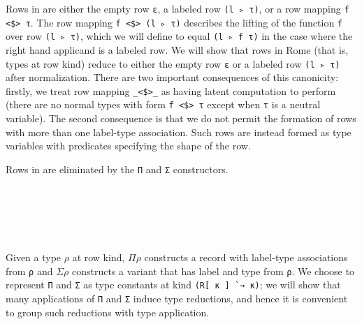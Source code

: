\documentclass[authoryear, acmsmall, screen, review, nonacm]{acmart}
\begin{document}
Rows in \Rome are either the empty row \verb!ε!, a labeled row \verb!(l ▹ τ)!, or a row mapping \verb!f <$> τ!. The row mapping \verb!f <$> (l ▹ τ)! describes the lifting of the function \verb!f! over row \verb!(l ▹ τ)!, which we will define to equal \verb!(l ▹ f τ)! in the case where the right hand applicand is a labeled row. We will show that rows in Rome (that is, types at row kind) reduce to either the empty row \verb!ε! or a labeled row \verb!(l ▹ τ)! after normalization. There are two important consequences of this canonicity: firstly, we treat row mapping \verb!_<$>_! as having latent computation to perform (there are no normal types with form \verb!f <$> τ! except when \verb!τ! is a neutral variable). The second consequence is that we do not permit the formation of rows with more than one label-type association. Such rows are instead formed as type variables with predicates specifying the shape of the row.

Rows in \Rome are eliminated by the \verb!Π! and \verb!Σ! constructors.

\begin{code}%
%
\>[2]%
\>[8]\AgdaSymbol{:}\<%
\\
\>[8][@{}l@{\AgdaIndent{0}}]%
\>[10]\AgdaSpace{}%
\AgdaSpace{}%
\AgdaSymbol{(}\AgdaOperator{\AgdaInductiveConstructor{R[}}\AgdaSpace{}%
\AgdaSpace{}%
\AgdaOperator{\AgdaInductiveConstructor{]}}\AgdaSpace{}%
\AgdaSpace{}%
\AgdaSymbol{)}\<%
\\
%
\\[\AgdaEmptyExtraSkip]%
%
\>[2]%
\>[8]\AgdaSymbol{:}\<%
\\
\>[8][@{}l@{\AgdaIndent{0}}]%
\>[10]\AgdaSpace{}%
\AgdaSpace{}%
\AgdaSymbol{(}\AgdaOperator{\AgdaInductiveConstructor{R[}}\AgdaSpace{}%
\AgdaSpace{}%
\AgdaOperator{\AgdaInductiveConstructor{]}}\AgdaSpace{}%
\AgdaSpace{}%
\AgdaSymbol{)}\<%
\end{code}

Given a type $\rho$ at row kind, $\Pi \rho$ constructs a record with label-type associations from \verb!ρ! and $\Sigma \rho$ constructs a variant that has label and type from \verb!ρ!. We choose to represent \verb!Π! and \verb!Σ! as type constants at kind \verb!(R[ κ ] `→ κ)!; we will show that many applications of \verb!Π! and \verb!Σ! induce type reductions, and hence it is convenient to group such reductions with type application.
\end{document}
